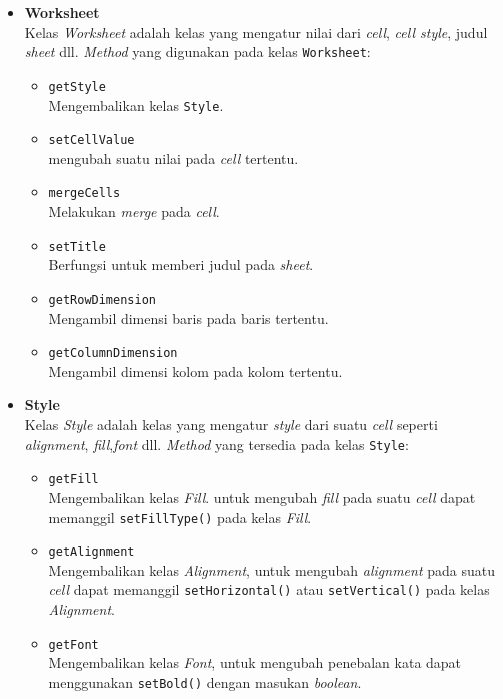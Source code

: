 \documentclass[a4paper,twoside]{article}
\begin{document}
\begin{enumerate}
\begin{enumerate}
\begin{itemize}
		\item \textbf{Worksheet} \\
		Kelas \textit{Worksheet} adalah kelas yang mengatur nilai dari \textit{cell}, \textit{cell style}, judul \textit{sheet} dll. \textit{Method} yang digunakan pada kelas \texttt{Worksheet}:
		\begin{itemize}
			\item \texttt{getStyle} \\
			Mengembalikan kelas \texttt{Style}.
			\item \texttt{setCellValue} \\
			mengubah suatu nilai pada \textit{cell} tertentu.
			\item \texttt{mergeCells} \\
			Melakukan \textit{merge} pada \textit{cell}.
			\item \texttt{setTitle} \\
			Berfungsi untuk memberi judul pada \textit{sheet}.
			\item \texttt{getRowDimension} \\
			Mengambil dimensi baris pada baris tertentu.
			\item \texttt{getColumnDimension}\\ 	
			Mengambil dimensi kolom pada kolom tertentu.
		\end{itemize}
	
	\item \textbf{Style} \\
	Kelas \textit{Style} adalah kelas yang mengatur \textit{style} dari suatu \textit{cell} seperti \textit{alignment}, \textit{fill},\textit{font} dll. \textit{Method} yang tersedia pada kelas \texttt{Style}:
	\begin{itemize}
		\item \texttt{getFill} \\
		Mengembalikan kelas \textit{Fill}. untuk mengubah \textit{fill} pada suatu \textit{cell} dapat memanggil \texttt{set\-Fill\-Type()} pada kelas \textit{Fill}.
		\item \texttt{getAlignment} \\
		Mengembalikan kelas \textit{Alignment}, untuk mengubah \textit{alignment} pada suatu \textit{cell} dapat memanggil \texttt{setHorizontal()} atau \texttt{setVertical()} pada kelas \textit{Alignment}.
		\item \texttt{getFont} \\
		 Mengembalikan kelas \textit{Font}, untuk mengubah penebalan kata dapat menggunakan \texttt{setBold()} dengan masukan \textit{boolean}.
	\end{itemize}


\end{itemize}
\end{enumerate}
\end{enumerate}
\end{document}
